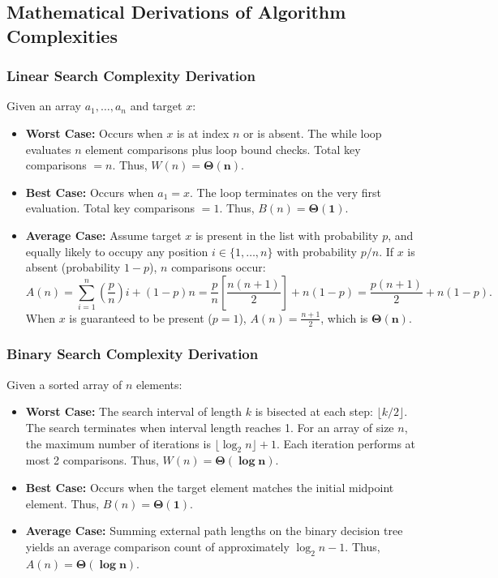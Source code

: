 \documentclass[10pt,a4paper]{article}
\theoremstyle{definition}
\begin{document}
\subsection{Mathematical Derivations of Algorithm Complexities}

\subsubsection{Linear Search Complexity Derivation}
Given an array $a_1, \dots, a_n$ and target $x$:
\begin{itemize}[leftmargin=*,itemsep=1pt,topsep=1pt]
    \item \textbf{Worst Case:} Occurs when $x$ is at index $n$ or is absent. The while loop evaluates $n$ element comparisons plus loop bound checks. Total key comparisons $= n$. Thus, $W(n) = \mathbf{\Theta(n)}$.
    \item \textbf{Best Case:} Occurs when $a_1 = x$. The loop terminates on the very first evaluation. Total key comparisons $= 1$. Thus, $B(n) = \mathbf{\Theta(1)}$.
    \item \textbf{Average Case:} Assume target $x$ is present in the list with probability $p$, and equally likely to occupy any position $i \in \{1, \dots, n\}$ with probability $p/n$. If $x$ is absent (probability $1-p$), $n$ comparisons occur:
    $$A(n) = \sum_{i=1}^n \left(\frac{p}{n}\right) i + (1 - p)n = \frac{p}{n} \left[\frac{n(n+1)}{2}\right] + n(1 - p) = \frac{p(n+1)}{2} + n(1 - p).$$
    When $x$ is guaranteed to be present ($p = 1$), $A(n) = \frac{n+1}{2}$, which is $\mathbf{\Theta(n)}$.
\end{itemize}

\subsubsection{Binary Search Complexity Derivation}
Given a sorted array of $n$ elements:
\begin{itemize}[leftmargin=*,itemsep=1pt,topsep=1pt]
    \item \textbf{Worst Case:} The search interval of length $k$ is bisected at each step: $\lfloor k/2 \rfloor$. The search terminates when interval length reaches 1. For an array of size $n$, the maximum number of iterations is $\lfloor \log_2 n \rfloor + 1$. Each iteration performs at most 2 comparisons. Thus, $W(n) = \mathbf{\Theta(\log n)}$.
    \item \textbf{Best Case:} Occurs when the target element matches the initial midpoint element. Thus, $B(n) = \mathbf{\Theta(1)}$.
    \item \textbf{Average Case:} Summing external path lengths on the binary decision tree yields an average comparison count of approximately $\log_2 n - 1$. Thus, $A(n) = \mathbf{\Theta(\log n)}$.
\end{itemize}
\end{document}
